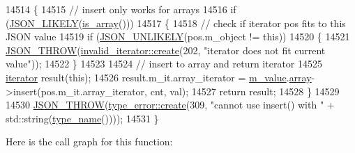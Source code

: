 \begin{DoxyCode}
14514     \{
14515         \textcolor{comment}{// insert only works for arrays}
14516         \textcolor{keywordflow}{if} (\hyperlink{json_8hpp_a41ecd1c4cf7c3d56477b9b685b5daa72}{JSON\_LIKELY}(\hyperlink{classnlohmann_1_1basic__json_aef9ce5dd2381caee1f8ddcdb5bdd9c65}{is\_array}()))
14517         \{
14518             \textcolor{comment}{// check if iterator pos fits to this JSON value}
14519             \textcolor{keywordflow}{if} (\hyperlink{json_8hpp_ab77582407c64944e7db1ea95ab520253}{JSON\_UNLIKELY}(pos.m\_object != \textcolor{keyword}{this}))
14520             \{
14521                 \hyperlink{json_8hpp_a6c274f6db2e65c1b66c7d41b06ad690f}{JSON\_THROW}(\hyperlink{classnlohmann_1_1detail_1_1invalid__iterator_a4e849260a3caa1b288c7e619130c6c09}{invalid\_iterator::create}(202, \textcolor{stringliteral}{"iterator does
       not fit current value"}));
14522             \}
14523 
14524             \textcolor{comment}{// insert to array and return iterator}
14525             \hyperlink{classnlohmann_1_1basic__json_a099316232c76c034030a38faa6e34dca}{iterator} result(\textcolor{keyword}{this});
14526             result.m\_it.array\_iterator = \hyperlink{classnlohmann_1_1basic__json_aeb0814f76966f99290cb29e127c90a77}{m\_value}.\hyperlink{unionnlohmann_1_1basic__json_1_1json__value_a7947687f3ae1911d6e9847e2b3226157}{array}->insert(pos.m\_it.array\_iterator, cnt, 
      val);
14527             \textcolor{keywordflow}{return} result;
14528         \}
14529 
14530         \hyperlink{json_8hpp_a6c274f6db2e65c1b66c7d41b06ad690f}{JSON\_THROW}(\hyperlink{classnlohmann_1_1detail_1_1type__error_aecc083aea4b698c33d042670ba50c10f}{type\_error::create}(309, \textcolor{stringliteral}{"cannot use insert() with "} + 
      std::string(\hyperlink{classnlohmann_1_1basic__json_a9d0a478571f82f0163b96b2424cd998f}{type\_name}())));
14531     \}
\end{DoxyCode}
Here is the call graph for this function\+:
\mbox{\label{classnlohmann_1_1basic__json_a404cfe1bdbf1dc6b229627fcf2afb95f}} 
